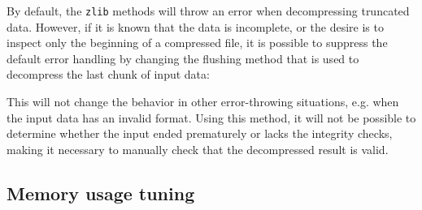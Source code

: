 By default, the \texttt{zlib} methods will throw an error when
decompressing truncated data. However, if it is known that the data is
incomplete, or the desire is to inspect only the beginning of a
compressed file, it is possible to suppress the default error handling
by changing the flushing method that is used to decompress the last
chunk of input data:

\begin{Shaded}
\begin{Highlighting}[]
\OperatorTok{=} \NormalTok{(}\OperatorTok{,} \NormalTok{)}\OperatorTok{;}

\NormalTok{(}
\OperatorTok{,}
\NormalTok{  \{ }\OperatorTok{:}\NormalTok{ \}}\OperatorTok{,}
\OperatorTok{,}\KeywordTok{=\textgreater{}}\NormalTok{ \{}
      \NormalTok{(}\OperatorTok{,}\OperatorTok{;}
       \OperatorTok{=} \OperatorTok{;}
\NormalTok{    \}}
    \NormalTok{())}\OperatorTok{;}
\NormalTok{  \})}\OperatorTok{;}
\end{Highlighting}
\end{Shaded}

This will not change the behavior in other error-throwing situations,
e.g. when the input data has an invalid format. Using this method, it
will not be possible to determine whether the input ended prematurely or
lacks the integrity checks, making it necessary to manually check that
the decompressed result is valid.

\subsection{Memory usage tuning}\label{memory-usage-tuning}

